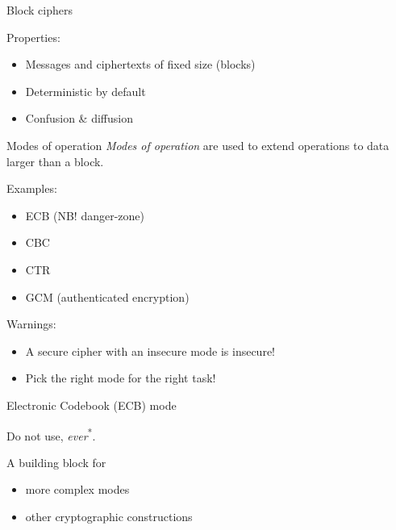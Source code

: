 \begin{frame}{Block ciphers}
\begin{center}
  \end{center}

  \pause
  Properties:
  \begin{itemize}[<+->]
    \item Messages and ciphertexts of fixed size (blocks)
    \item Deterministic by default
    \item Confusion \& diffusion
  \end{itemize}
\end{frame}

\begin{frame}{Modes of operation}
  \emph{Modes of operation} are used to extend operations to data larger than a block.

  \pause
  Examples:
  \begin{itemize}[<+->]
    \item ECB (NB! danger-zone)
    \item CBC
    \item CTR
    \item GCM (authenticated encryption)
  \end{itemize}

  \pause
  Warnings:
  \begin{itemize}[<+->]
    \item A secure cipher with an insecure mode is insecure!
    \item Pick the right mode for the right task!
  \end{itemize}  
\end{frame}

\begin{frame}{Electronic Codebook (ECB) mode}
  \begin{center}
  \end{center}

  \pause
  Do not use, \emph{ever}\textsuperscript{*}.

  \pause
  A building block for
  \begin{itemize}[<+->]
    \item more complex modes
    \item other cryptographic constructions
  \end{itemize}
\end{frame}

